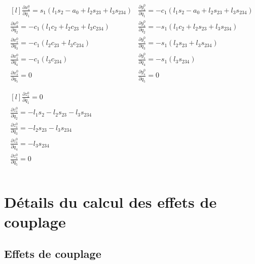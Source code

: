 \begin{appendices}
	\begin{equation} \label{eq_linear_jacobian}
		\begin{matrix}
			\begin{matrix*}[l]
				\frac{\partial x_s^0}{\partial q_1} = s_1 (l_1 s_2 - a_0 + l_2 s_{23} + l_3 s_{234}) & 
				\frac{\partial y_s^0}{\partial q_1} = -c_1 (l_1 s_{2} - a_0 + l_2 s_{23} + l_3 s_{234}) \\
				\frac{\partial x_s^0}{\partial q_2} = -c_1 (l_1 c_2 + l_2 c_{23} + l_3 c_{234}) &
				\frac{\partial y_s^0}{\partial q_2} = -s_1 (l_1 c_{2} + l_2 s_{23} + l_3 s_{234}) \\
				\frac{\partial x_s^0}{\partial q_3} = -c_1 (l_2 c_{23} + l_3 c_{234}) &
				\frac{\partial y_s^0}{\partial q_3} = -s_1 (l_2 s_{23} + l_3 s_{234}) \\
				\frac{\partial x_s^0}{\partial q_4} = -c_1 (l_3 c_{234}) &
				\frac{\partial y_s^0}{\partial q_4} = -s_1 (l_3 s_{234}) \\
				\frac{\partial x_s^0}{\partial q_5} = 0 &
				\frac{\partial y_s^0}{\partial q_5} = 0 \\
			\end{matrix*} \\
			\begin{matrix*}[l]
				\frac{\partial z_s^0}{\partial q_1} = 0 \\
				\frac{\partial z_s^0}{\partial q_2} = -l_1 s_2 - l_2 s_{23} - l_3 s_{234} \\
				\frac{\partial z_s^0}{\partial q_3} = -l_2 s_{23} - l_3 s_{234} \\
				\frac{\partial z_s^0}{\partial q_4} = -l_3 s_{234} \\
				\frac{\partial z_s^0}{\partial q_5} = 0 \\
			\end{matrix*}
		\end{matrix}
	\end{equation}	
	
	\chapter{Détails du calcul des effets de couplage} \label{app_coupling_effect_details}
	
	\vspace{5mm}
	
	\section{Effets de couplage} \label{app_coupling_effect_details_sec_coupling}
	

\end{appendices}
